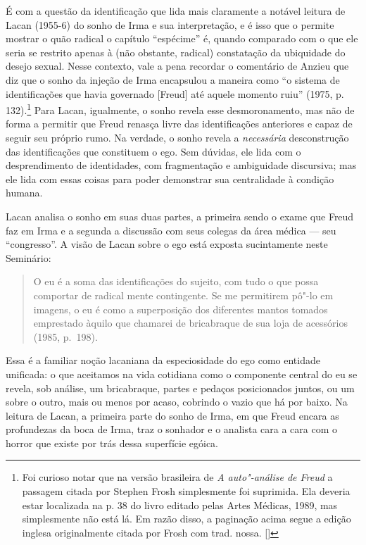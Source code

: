 É com a questão da identificação que lida mais claramente a notável
leitura de Lacan (1955-6) do sonho de Irma e sua interpretação, e é isso
que o permite mostrar o quão radical o capítulo ``espécime'' é, quando
comparado com o que ele seria se restrito apenas à (não obstante,
radical) constatação da ubiquidade do desejo sexual. Nesse contexto,
vale a pena recordar o comentário de Anzieu que diz que o sonho da
injeção de Irma encapsulou a maneira como ``o sistema de identificações
que havia governado {[}Freud{]} até aquele momento ruiu'' (1975, p.
132).\footnote{Foi curioso notar que na versão brasileira de \emph{A
  auto"-análise de Freud} a passagem citada por Stephen Frosh simplesmente
  foi suprimida. Ela deveria estar localizada na p. 38 do livro editado
  pelas Artes Médicas, 1989, mas simplesmente não está lá. Em razão
  disso, a paginação acima segue a edição inglesa originalmente citada
  por Frosh com trad. nossa. []} Para Lacan, igualmente, o sonho
revela esse desmoronamento, mas não de forma a permitir que Freud
renasça livre das identificações anteriores e capaz de seguir seu
próprio rumo. Na verdade, o sonho revela a \emph{necessária}
desconstrução das identificações que constituem o ego. Sem dúvidas, ele
lida com o desprendimento de identidades, com fragmentação e ambiguidade
discursiva; mas ele lida com essas coisas para poder demonstrar sua
centralidade à condição humana.

Lacan analisa o sonho em suas duas partes, a primeira sendo o exame que
Freud faz em Irma e a segunda a discussão com seus colegas da área
médica --- seu ``congresso''. A visão de Lacan sobre o ego está exposta
sucintamente neste Seminário:

\begin{quote}
O eu é a soma das identificações do sujeito, com tudo o que possa
comportar de radical mente contingente. Se me permitirem pô"-lo em
imagens, o eu é como a superposição dos diferentes mantos tomados
emprestado àquilo que chamarei de bricabraque de sua loja de acessórios
(1985, p.~198).
\end{quote}

Essa é a familiar noção lacaniana da especiosidade do ego como entidade
unificada: o que aceitamos na vida cotidiana como o componente central
do eu se revela, sob análise, um bricabraque, partes e pedaços
posicionados juntos, ou um sobre o outro, mais ou menos por acaso,
cobrindo o vazio que há por baixo. Na leitura de Lacan, a primeira parte
do sonho de Irma, em que Freud encara as profundezas da boca de Irma,
traz o sonhador e o analista cara a cara com o horror que existe por
trás dessa superfície egóica.

